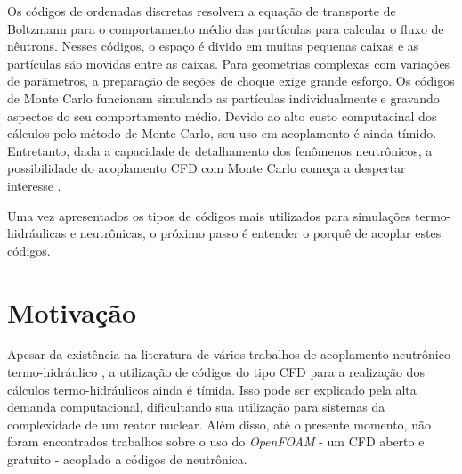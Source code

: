 Os códigos de ordenadas discretas resolvem 
a equação de transporte de Boltzmann para o comportamento médio das partículas para calcular o 
fluxo de nêutrons. Nesses códigos, o espaço é divido em muitas pequenas caixas e as partículas 
são movidas entre as caixas. Para geometrias complexas com variações de parâmetros, a preparação de 
seções de choque exige grande esforço. Os códigos de Monte Carlo funcionam simulando as partículas 
individualmente e gravando aspectos do seu comportamento médio. Devido ao alto custo computacinal 
dos cálculos pelo método de Monte Carlo, seu uso em acoplamento é ainda tímido. Entretanto, dada a capacidade de detalhamento dos fenômenos neutrônicos, a possibilidade do acoplamento CFD com Monte Carlo começa a despertar interesse \cite{Leppanen2012}.

Uma vez apresentados os tipos de códigos mais utilizados para simulações termo-hidráulicas
e neutrônicas, o próximo passo é entender o porquê de acoplar estes códigos.

%

\section*{Motivação}

Apesar da existência na literatura de vários trabalhos de acoplamento neutrônico-termo-hidráulico \cite{Faghihi2011}, 
a utilização de códigos do tipo CFD para a realização dos cálculos 
termo-hidráulicos ainda é tímida. Isso pode ser explicado pela alta demanda
computacional, dificultando sua utilização para sistemas da complexidade de um
reator nuclear. Além disso, até o presente momento, não
foram encontrados trabalhos
sobre o uso do \textit{OpenFOAM} - 
um CFD aberto e gratuito \cite{Jasak2007} - acoplado a códigos de neutrônica.


